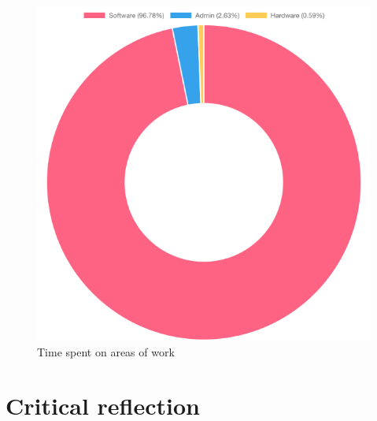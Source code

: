 \begin{figure}[h]
\centering
\includegraphics[scale=0.5]{04_Artefakte/01_Abbildungen/time-spent-on-types-of-work}
\caption[Time spent on areas of work]{Time spent on areas of work\protect}
\label{fig:timeSpentTypeOfWork}
\end{figure}

\section{Critical reflection}
